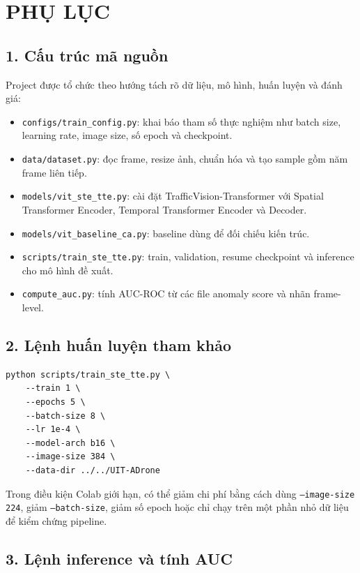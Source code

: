\section*{PHỤ LỤC}

\subsection*{1. Cấu trúc mã nguồn}

Project được tổ chức theo hướng tách rõ dữ liệu, mô hình, huấn luyện và đánh giá:

\begin{itemize}
    \item \texttt{configs/train\_config.py}: khai báo tham số thực nghiệm như batch size, learning rate, image size, số epoch và checkpoint.
    \item \texttt{data/dataset.py}: đọc frame, resize ảnh, chuẩn hóa và tạo sample gồm năm frame liên tiếp.
    \item \texttt{models/vit\_ste\_tte.py}: cài đặt TrafficVision-Transformer với Spatial Transformer Encoder, Temporal Transformer Encoder và Decoder.
    \item \texttt{models/vit\_baseline\_ca.py}: baseline dùng để đối chiếu kiến trúc.
    \item \texttt{scripts/train\_ste\_tte.py}: train, validation, resume checkpoint và inference cho mô hình đề xuất.
    \item \texttt{compute\_auc.py}: tính AUC-ROC từ các file anomaly score và nhãn frame-level.
\end{itemize}

\subsection*{2. Lệnh huấn luyện tham khảo}

\begin{verbatim}
python scripts/train_ste_tte.py \
    --train 1 \
    --epochs 5 \
    --batch-size 8 \
    --lr 1e-4 \
    --model-arch b16 \
    --image-size 384 \
    --data-dir ../../UIT-ADrone
\end{verbatim}

Trong điều kiện Colab giới hạn, có thể giảm chi phí bằng cách dùng \texttt{--image-size 224}, giảm \texttt{--batch-size}, giảm số epoch hoặc chỉ chạy trên một phần nhỏ dữ liệu để kiểm chứng pipeline.

\subsection*{3. Lệnh inference và tính AUC}

